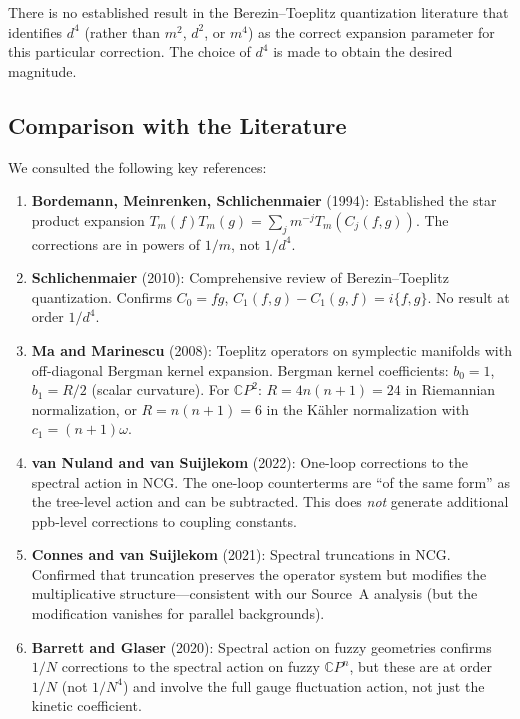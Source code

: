 \documentclass[12pt,a4paper]{article}
\theoremstyle{definition}
\theoremstyle{remark}
\newcommand{\CP}{\mathbb{C}P}
\begin{document}
There is no established result in the Berezin--Toeplitz quantization
literature that identifies $d^4$ (rather than $m^2$, $d^2$, or $m^4$) as
the correct expansion parameter for this particular correction. The choice
of $d^4$ is made to obtain the desired magnitude.

\subsection{Comparison with the Literature}

We consulted the following key references:

\begin{enumerate}
\item \textbf{Bordemann, Meinrenken, Schlichenmaier} (1994): Established the
  star product expansion $T_m(f)T_m(g) = \sum_j m^{-j} T_m(C_j(f,g))$.
  The corrections are in powers of $1/m$, not $1/d^4$.

\item \textbf{Schlichenmaier} (2010): Comprehensive review of Berezin--Toeplitz
  quantization. Confirms $C_0 = fg$,
  $C_1(f,g) - C_1(g,f) = i\{f,g\}$. No result at order $1/d^4$.

\item \textbf{Ma and Marinescu} (2008): Toeplitz operators on symplectic
  manifolds with off-diagonal Bergman kernel expansion. Bergman kernel
  coefficients: $b_0 = 1$, $b_1 = R/2$ (scalar curvature).
  For $\CP^2$: $R = 4n(n+1) = 24$ in Riemannian normalization, or
  $R = n(n+1) = 6$ in the K\"ahler normalization with $c_1 = (n+1)\omega$.

\item \textbf{van Nuland and van Suijlekom} (2022): One-loop corrections
  to the spectral action in NCG. The one-loop counterterms are
  ``of the same form'' as the tree-level action and can be subtracted.
  This does \emph{not} generate additional ppb-level corrections to
  coupling constants.

\item \textbf{Connes and van Suijlekom} (2021): Spectral truncations in
  NCG. Confirmed that truncation preserves the operator system but
  modifies the multiplicative structure---consistent with our Source~A
  analysis (but the modification vanishes for parallel backgrounds).

\item \textbf{Barrett and Glaser} (2020): Spectral action on fuzzy
  geometries confirms $1/N$ corrections to the spectral action on
  fuzzy $\CP^n$, but these are at order $1/N$ (not $1/N^4$) and
  involve the full gauge fluctuation action, not just the kinetic
  coefficient.
\end{enumerate}
\end{document}
